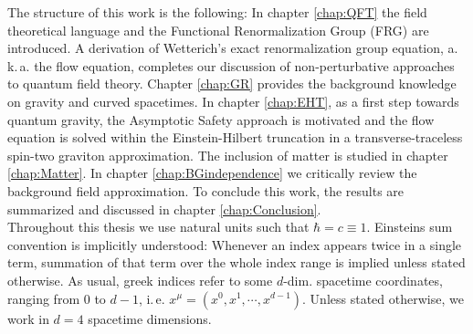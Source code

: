 The structure of this work is the following: In chapter \ref{chap:QFT} the field theoretical language and the Functional Renormalization Group (FRG) are introduced. A derivation of Wetterich's exact renormalization group equation, a.\,k.\,a. the flow equation,  completes our discussion of non-perturbative approaches to quantum field theory. Chapter \ref{chap:GR} provides the background knowledge on gravity and curved spacetimes. In chapter \ref{chap:EHT}, as a first step towards quantum gravity, the Asymptotic Safety approach is motivated and the flow equation is solved within the Einstein-Hilbert truncation in a transverse-traceless spin-two graviton approximation. The inclusion of matter is studied in chapter \ref{chap:Matter}. In chapter \ref{chap:BGindependence} we critically review the background field approximation.
To conclude this work, the results are summarized and discussed in chapter \ref{chap:Conclusion}. \\
 Throughout this thesis we use natural units such that $\hbar = c  \equiv 1$. Einsteins sum convention is implicitly understood: Whenever an index appears twice in a single term, summation of that term over the whole index range is implied unless stated otherwise. As usual, greek indices refer to some $d$-dim. spacetime coordinates, ranging from $0$ to $d-1$, i.\,e. $x^{\mu} = (x^0, x^1, \cdots, x^{d-1})$. Unless stated otherwise, we work in $d=4$ spacetime dimensions.

 